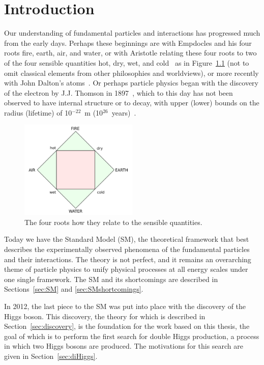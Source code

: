 
\chapter{Introduction\label{ch:intro}}

Our understanding of fundamental particles and interactions has progressed much from the early days.
Perhaps these beginnings are with Empdocles and his four roots fire, earth, air, and water, or with
Aristotle relating these four roots to two of the four sensible quantities hot, dry, wet, and
cold~\cite{0415078547} as in Figure~\ref{fig:aristotle}
(not to omit classical elements from other philosophies and worldviews), or more recently with
John Dalton's atoms~\cite{dalton}. Or perhaps particle physics began with
the discovery of the electron by J.J. Thomson in 1897~\cite{thomson:electron},
which to this day has not been observed
to have internal structure or to decay, with upper (lower) bounds on the radius (lifetime) of
10$^{-22}$~m (10$^{26}$~years)~\cite{1988PhST...22..102D,2002PhLB..525...29B}.

\begin{figure}[ht]
 \begin{center}
    \includegraphics[width=0.50\textwidth]{figures/intro/Four_elements_representation.png}
      \end{center}
\caption{The four roots how they relate to the sensible quantities.}
\label{fig:aristotle}
\end{figure}

Today we have the Standard Model (SM), the theoretical framework that best describes the
experimentally observed phenomena of the fundamental particles and their interactions. The theory
is not perfect, and it remains an overarching theme of particle physics to unify physical processes
at all energy scales under one single framework.
The SM and its shortcomings are described in
Sections~\ref{sec:SM} and \ref{sec:SMshortcomings}.

In 2012, the last piece to the SM was put into place with the discovery of the Higgs boson.
This discovery, the theory for which is described in Section~\ref{sec:discovery},
is the foundation for the work based on
this thesis, the goal of which is to perform the first search for double Higgs production, a process
in which two Higgs bosons are produced. The motivations for this search
are given in Section~\ref{sec:diHiggs}.


